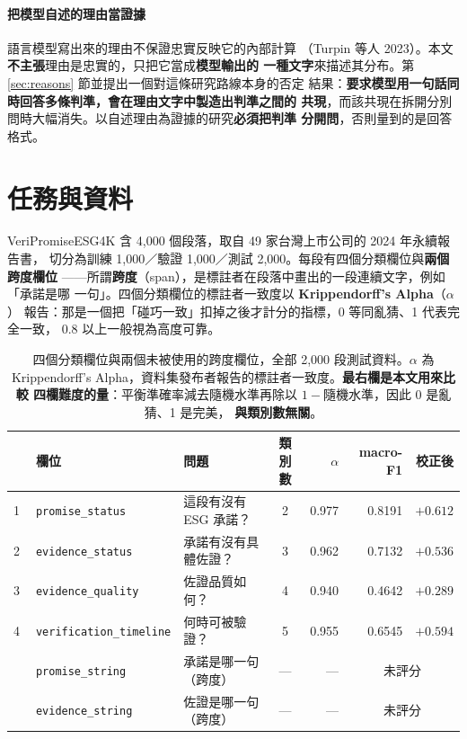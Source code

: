 \documentclass[11pt,a4paper]{ctexart}
\newcommand{\fn}[1]{\texttt{#1}}
\begin{document}
\paragraph{把模型自述的理由當證據} 語言模型寫出來的理由不保證忠實反映它的內部計算
（Turpin 等人 2023）。本文\textbf{不主張}理由是忠實的，只把它當成\textbf{模型輸出的
一種文字}來描述其分布。第 \ref{sec:reasons} 節並提出一個對這條研究路線本身的否定
結果：\textbf{要求模型用一句話同時回答多條判準，會在理由文字中製造出判準之間的
共現}，而該共現在拆開分別問時大幅消失。以自述理由為證據的研究\textbf{必須把判準
分開問}，否則量到的是回答格式。

\section{任務與資料}

VeriPromiseESG4K 含 4,000 個段落，取自 49 家台灣上市公司的 2024 年永續報告書，
切分為訓練 1,000／驗證 1,000／測試 2,000。每段有四個分類欄位與\textbf{兩個跨度欄位}
——所謂\textbf{跨度}（span），是標註者在段落中畫出的一段連續文字，例如「承諾是哪
一句」。四個分類欄位的標註者一致度以 \textbf{Krippendorff's Alpha}（$\alpha$）
報告：那是一個把「碰巧一致」扣掉之後才計分的指標，0 等同亂猜、1 代表完全一致，
0.8 以上一般視為高度可靠。

\begin{table}[h]
\centering\small
\begin{tabular}{@{}clp{4.3cm}crrr@{}}
\toprule
 & 欄位 & 問題 & 類別數 & $\alpha$ & macro-F1 & \textbf{校正後} \\
\midrule
\textcircled{1} & \fn{promise\_status} & 這段有沒有 ESG 承諾？ & 2 & 0.977 & 0.8191 & $+0.612$ \\
\textcircled{2} & \fn{evidence\_status} & 承諾有沒有具體佐證？ & 3 & 0.962 & 0.7132 & $+0.536$ \\
\rowcolor{yellow!15}
\textcircled{3} & \fn{evidence\_quality} & 佐證品質如何？ & 4 & 0.940 & 0.4642 & $\mathbf{+0.289}$ \\
\textcircled{4} & \fn{verification\_timeline} & 何時可被驗證？ & 5 & 0.955 & 0.6545 & $+0.594$ \\
\midrule
 & \fn{promise\_string} & 承諾是哪一句（跨度） & --- & --- & \multicolumn{2}{c}{未評分} \\
 & \fn{evidence\_string} & 佐證是哪一句（跨度） & --- & --- & \multicolumn{2}{c}{未評分} \\
\bottomrule
\end{tabular}
\caption{四個分類欄位與兩個未被使用的跨度欄位，全部 2,000 段測試資料。$\alpha$ 為
Krippendorff's Alpha，資料集發布者報告的標註者一致度。\textbf{最右欄是本文用來比較
四欄難度的量}：平衡準確率減去隨機水準再除以 $1-$隨機水準，因此 0 是亂猜、1 是完美，
\textbf{與類別數無關}。}
\end{table}
\end{document}
